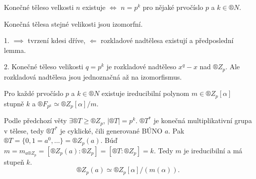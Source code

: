 \documentclass[12pt]{article}                   %
\begin{document}
        \begin{veta}
            Konečné těleso velkosti $n$ existuje $\Leftrightarrow$ $n=p^k$ pro nějaké prvočíslo $p$ a $k \in ®N$.

            Konečná tělesa stejné velikosti jsou izomorfní.

            \begin{dukazin}
                1. $\implies$ tvrzení kdesi dříve, $\Leftarrow$ rozkladové nadtělesa existují a předposlední lemma.

                2. Konečné těleso velikosti $q=p^k$ je rozkladové nadtěleso $x^q-x$ nad $®Z_p$. Ale rozkladová nadtělesa jsou jednoznačná až na izomorfismus.
            \end{dukazin}
        \end{veta}

        \begin{veta}
            Pro každé prvočíslo $p$ a $k \in ®N$ existuje ireducibilní polynom $m \in ®Z_p[\alpha]$ stupně $k$ a $®F_{p^k} \simeq ®Z_p[\alpha]/m$.

            \begin{dukazin}
                Podle předchozí věty $\exists ®T ≥ ®Z_p$, $|®T|=p^k$. $®T^*$ je konečná multiplikativní grupa v tělese, tedy $®T^*$ je cyklické, čili generované BÚNO $a$. Pak $®T=\{0,1=a^0,…\}=®Z_p(a)$. Búď $m = m_{a®Z_p}=[®Z_p(a):®Z_p]=[®T:®Z_p]=k$. Tedy $m$ je ireducibilní a má stupeň $k$.
                $$ ®Z_p(a) \simeq ®Z_p[\alpha]/(m(\alpha)). $$
            \end{dukazin}
        \end{veta}
\end{document}
